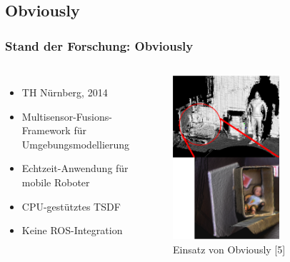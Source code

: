     
    
\subsection*{Obviously}


    \begin{frame}[t]
    \frametitle{Stand der Forschung: Obviously}
      
      \begin{columns}[t]
      \column[]{7cm}
      
      \begin{itemize}
      \item TH Nürnberg, 2014
      \item Multisensor-Fusions-Framework für Umgebungsmodellierung
      \item Echtzeit-Anwendung für mobile Roboter
      \item CPU-gestütztes TSDF
      \item Keine ROS-Integration 
      
      
     \end{itemize}
     
     \column{5cm}
      
       \begin{figure}[h]
       \vspace{-0.5cm}
 	\centering
 	    \includegraphics[width=0.65\textwidth]{images/obviosly_concat}
 	\caption{Einsatz von Obviously [5]} 
       \end{figure}
  
    \end{columns}
     
    \end{frame}
    
